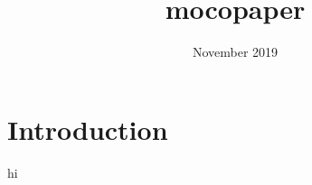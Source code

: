 \documentclass{article}
\title{mocopaper}
\author{ }
\date{November 2019}
\begin{document}
\maketitle

\section{Introduction}

hi
\end{document}
